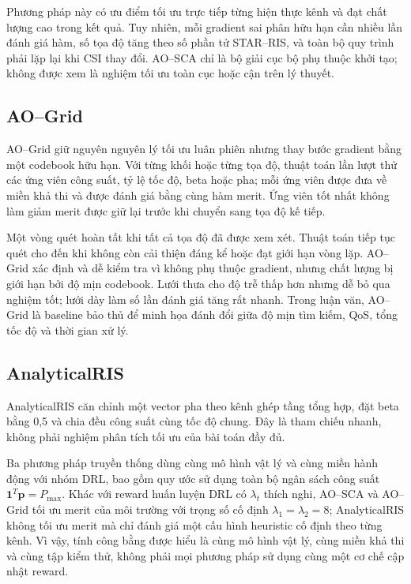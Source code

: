 Phương pháp này có ưu điểm tối ưu trực tiếp từng hiện thực kênh và đạt chất lượng cao trong kết quả. Tuy nhiên, mỗi gradient sai phân hữu hạn cần nhiều lần đánh giá hàm, số tọa độ tăng theo số phần tử STAR--RIS, và toàn bộ quy trình phải lặp lại khi CSI thay đổi. AO--SCA chỉ là bộ giải cục bộ phụ thuộc khởi tạo; không được xem là nghiệm tối ưu toàn cục hoặc cận trên lý thuyết.

\subsection{AO--Grid}
AO--Grid giữ nguyên nguyên lý tối ưu luân phiên nhưng thay bước gradient bằng một codebook hữu hạn. Với từng khối hoặc từng tọa độ, thuật toán lần lượt thử các ứng viên công suất, tỷ lệ tốc độ, beta hoặc pha; mỗi ứng viên được đưa về miền khả thi và được đánh giá bằng cùng hàm merit. Ứng viên tốt nhất không làm giảm merit được giữ lại trước khi chuyển sang tọa độ kế tiếp.

Một vòng quét hoàn tất khi tất cả tọa độ đã được xem xét. Thuật toán tiếp tục quét cho đến khi không còn cải thiện đáng kể hoặc đạt giới hạn vòng lặp. AO--Grid xác định và dễ kiểm tra vì không phụ thuộc gradient, nhưng chất lượng bị giới hạn bởi độ mịn codebook. Lưới thưa cho độ trễ thấp hơn nhưng dễ bỏ qua nghiệm tốt; lưới dày làm số lần đánh giá tăng rất nhanh. Trong luận văn, AO--Grid là baseline bảo thủ để minh họa đánh đổi giữa độ mịn tìm kiếm, QoS, tổng tốc độ và thời gian xử lý.

\subsection{AnalyticalRIS}
AnalyticalRIS căn chỉnh một vector pha theo kênh ghép tầng tổng hợp, đặt beta bằng 0,5 và chia đều công suất cùng tốc độ chung. Đây là tham chiếu nhanh, không phải nghiệm phân tích tối ưu của bài toán đầy đủ.

Ba phương pháp truyền thống dùng cùng mô hình vật lý và cùng miền hành động với nhóm DRL, bao gồm quy ước sử dụng toàn bộ ngân sách công suất $\mathbf{1}^T\bm p=P_{\max}$. Khác với reward huấn luyện DRL có $\lambda_t$ thích nghi, AO--SCA và AO--Grid tối ưu merit của môi trường với trọng số cố định $\lambda_1=\lambda_2=8$; AnalyticalRIS không tối ưu merit mà chỉ đánh giá một cấu hình heuristic cố định theo từng kênh. Vì vậy, tính công bằng được hiểu là cùng mô hình vật lý, cùng miền khả thi và cùng tập kiểm thử, không phải mọi phương pháp sử dụng cùng một cơ chế cập nhật reward.

